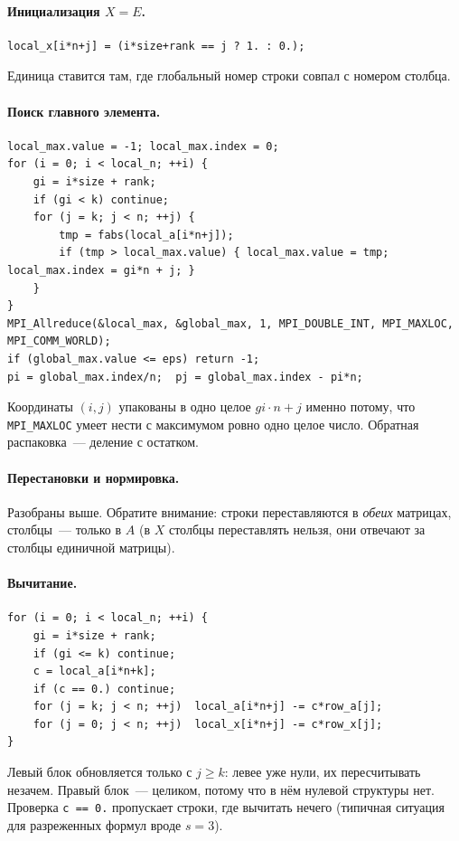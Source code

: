 \documentclass[11pt,a4paper]{report}
\begin{document}
\paragraph{Инициализация $X=E$.}
\begin{lstlisting}[style=c]
local_x[i*n+j] = (i*size+rank == j ? 1. : 0.);
\end{lstlisting}
Единица ставится там, где глобальный номер строки совпал с номером столбца.

\paragraph{Поиск главного элемента.}
\begin{lstlisting}[style=c]
local_max.value = -1; local_max.index = 0;
for (i = 0; i < local_n; ++i) {
    gi = i*size + rank;
    if (gi < k) continue;
    for (j = k; j < n; ++j) {
        tmp = fabs(local_a[i*n+j]);
        if (tmp > local_max.value) { local_max.value = tmp; local_max.index = gi*n + j; }
    }
}
MPI_Allreduce(&local_max, &global_max, 1, MPI_DOUBLE_INT, MPI_MAXLOC, MPI_COMM_WORLD);
if (global_max.value <= eps) return -1;
pi = global_max.index/n;  pj = global_max.index - pi*n;
\end{lstlisting}
Координаты $(i,j)$ упакованы в одно целое $gi\cdot n+j$ именно потому, что
\texttt{MPI\_MAXLOC} умеет нести с максимумом ровно одно целое число. Обратная
распаковка~--- деление с остатком.

\paragraph{Перестановки и нормировка.} Разобраны выше. Обратите внимание:
строки переставляются в \emph{обеих} матрицах, столбцы~--- только в $A$
(в $X$ столбцы переставлять нельзя, они отвечают за столбцы единичной матрицы).

\paragraph{Вычитание.}
\begin{lstlisting}[style=c]
for (i = 0; i < local_n; ++i) {
    gi = i*size + rank;
    if (gi <= k) continue;
    c = local_a[i*n+k];
    if (c == 0.) continue;
    for (j = k; j < n; ++j)  local_a[i*n+j] -= c*row_a[j];
    for (j = 0; j < n; ++j)  local_x[i*n+j] -= c*row_x[j];
}
\end{lstlisting}
Левый блок обновляется только с $j\ge k$: левее уже нули, их пересчитывать
незачем. Правый блок~--- целиком, потому что в нём нулевой структуры нет.
Проверка \texttt{c == 0.} пропускает строки, где вычитать нечего (типичная
ситуация для разреженных формул вроде $s=3$).
\end{document}
